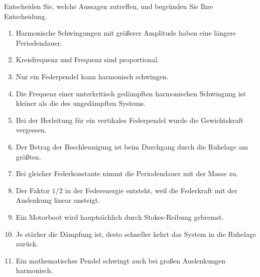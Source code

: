 \begin{ExerciseBlock}
Entscheiden Sie, welche Aussagen zutreffen, und begründen Sie Ihre Entscheidung.
\begin{enumerate}
\item Harmonische Schwingungen mit größerer Amplitude haben eine längere Periodendauer.
\item Kreisfrequenz und Frequenz sind proportional.
\item Nur ein Federpendel kann harmonisch schwingen.
\item Die Frequenz einer unterkritisch gedämpften harmonischen Schwingung ist kleiner als die des ungedämpften Systems.
\item Bei der Herleitung für ein vertikales Federpendel wurde die Gewichtskraft vergessen.
\item Der Betrag der Beschleunigung ist beim Durchgang durch die Ruhelage am größten.
\item Bei gleicher Federkonstante nimmt die Periodendauer mit der Masse zu.
\item Der Faktor $1/2$ in der Federenergie entsteht, weil die Federkraft mit der Auslenkung linear ansteigt.
\item Ein Motorboot wird hauptsächlich durch Stokes-Reibung gebremst.
\item Je stärker die Dämpfung ist, desto schneller kehrt das System in die Ruhelage zurück.
\item Ein mathematisches Pendel schwingt auch bei großen Auslenkungen harmonisch.
\end{enumerate}
\end{ExerciseBlock}
